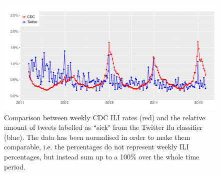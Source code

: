 \documentclass[11pt, a4paper,twoside]{report}\usepackage[]{graphicx}\usepackage[]{color}
\begin{document}
\begin{figure}[htbp!]
  \includegraphics[width=1\linewidth]{26_cdc_twitter_comp_nat_ma1.pdf}
  \caption{}
  \caption{Comparison between weekly CDC ILI rates (red) and the relative amount of tweets labelled as ``sick" from the Twitter flu classifier (blue). The data has been normalised in order to make them comparable, i.e. the percentages do not represent weekly ILI percentages, but instead sum up to a 100\% over the whole time period.}
    \label{fig:cdc_tw_comp_nat_ma1}
\end{figure}
\end{document}
